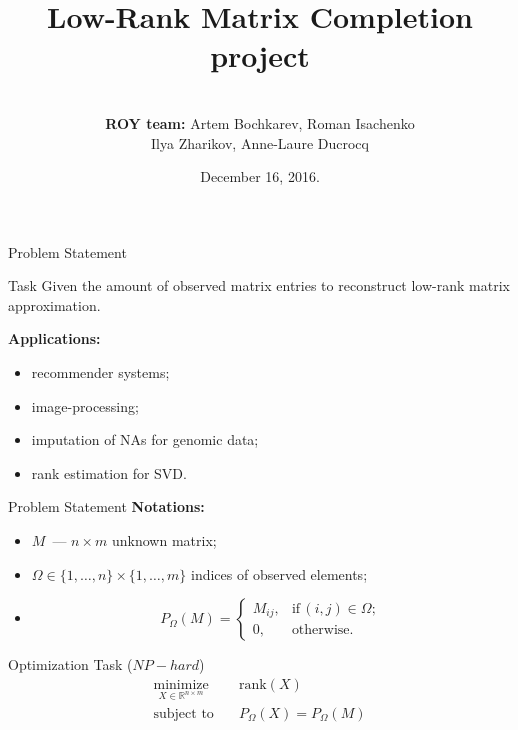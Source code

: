 \documentclass{beamer}
\title[\hbox to 56mm{Matrix Completion  \hfill\insertframenumber\,/\,\inserttotalframenumber}]
{Low-Rank Matrix Completion project}
\author[ROY team]{\\
				{\small \textbf{ROY team:} Artem Bochkarev, Roman Isachenko \\
					 Ilya Zharikov, Anne-Laure Ducrocq}}
\institute[SkolTech]{Skolkovo Institute of Science and Technology \\
	Methods of Optimization course 
    \vspace{0.3cm}
}
\date{December 16, 2016.}
\begin{document}
\begin{frame}
\titlepage
\end{frame}
\begin{frame}{Problem Statement}
\begin{block}{Task}	
	Given the amount of observed matrix entries to reconstruct low-rank matrix approximation.
\end{block}
\vspace{0.3cm}
\textbf{Applications:}
\begin{itemize}
	\item  recommender systems;
	\item image-processing;
	\item imputation of NAs for genomic data;
	\item rank estimation for SVD.
\end{itemize}
\end{frame}
\begin{frame}{Problem Statement}
\textbf{Notations:}
\begin{itemize}
	\item $M$~--- $n \times m$ unknown matrix;
	\item $\Omega \in \{1, \dots, n\} \times \{1, \dots, m\}$ indices of observed elements;
	\item 
	$$
	P_{\Omega} (M) = 
	\begin{cases}
	M_{ij}, &\text{if} \, (i, j) \in \Omega;\\
	0, &\text{otherwise}.
	\end{cases}
	$$
\end{itemize}
\begin{block}{Optimization Task ($NP-hard$)}
	\vspace{-0.5cm}
	\begin{align*}
		\mathop{\text{minimize}}\limits_{X \in \mathbb{R}^{n \times m}} \quad & 
		\text{rank} (X) \\
		\text{subject to} \quad & P_{\Omega} (X) = P_{\Omega} (M)
	\end{align*}
\end{block}
\end{frame}
\end{document}
